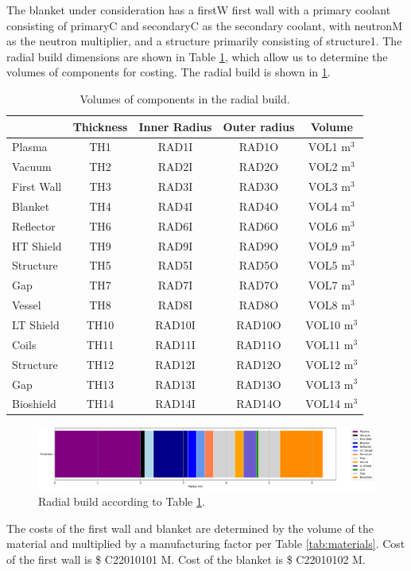 The blanket under consideration has a firstW first wall with a primary coolant consisting of primaryC and secondaryC as the secondary coolant, with neutronM as the neutron multiplier, and a structure primarily consisting of structure1. The radial build dimensions are shown in Table \ref{tab:volumes}, which allow us to determine the volumes of components for costing.  The radial build is shown in \ref{fig:radial}.  \\


\begin{table}[h!]
    \centering
    \begin{tabular}{l c  c c c}
    \hline
        &	Thickness	&	Inner Radius	&	Outer radius	&	Volume		\\
        \hline
Plasma	&	TH1	&	RAD1I	&	RAD1O	&	VOL1	m$^{3}$	\\
Vacuum	&	TH2	&	RAD2I	&	RAD2O	&	VOL2	m$^{3}$	\\
First Wall	&	TH3	&	RAD3I	&	RAD3O	&	VOL3	m$^{3}$	\\
Blanket	&	TH4	&	RAD4I	&	RAD4O	&	VOL4	m$^{3}$	\\
Reflector	&	TH6	&	RAD6I	&	RAD6O	&	VOL6	m$^{3}$	\\
HT Shield	&	TH9	&	RAD9I	&	RAD9O	&	VOL9	m$^{3}$	\\
Structure	&	TH5	&	RAD5I	&	RAD5O	&	VOL5	m$^{3}$	\\
Gap	&	TH7	&	RAD7I	&	RAD7O	&	VOL7	m$^{3}$	\\
Vessel	&	TH8	&	RAD8I	&	RAD8O	&	VOL8	m$^{3}$	\\
LT Shield	&	TH10	&	RAD10I	&	RAD10O	&	VOL10	m$^{3}$	\\
Coils	&	TH11	&	RAD11I	&	RAD11O	&	VOL11	m$^{3}$	\\
Structure	&	TH12	&	RAD12I	&	RAD12O	&	VOL12	m$^{3}$	\\
Gap	&	TH13	&	RAD13I	&	RAD13O	&	VOL13	m$^{3}$	\\
Bioshield	&	TH14	&	RAD14I	&	RAD14O	&	VOL14	m$^{3}$	\\

        \hline
    \end{tabular}
    \caption{Volumes of components in the radial build.}
    \label{tab:volumes}
\end{table}

\begin{figure}
    \centering
    \includegraphics[width=0.9\linewidth]{Figures/radial_build.pdf}
    \caption{Radial build according to Table \ref{tab:volumes}.}
    \label{fig:radial}
\end{figure}



The costs of the first wall and blanket are determined by the volume of the material and multiplied by a manufacturing factor per Table \ref{tab:materials}.   Cost of the first wall is \$ C22010101 M.  Cost of the blanket is \$ C22010102 M.

